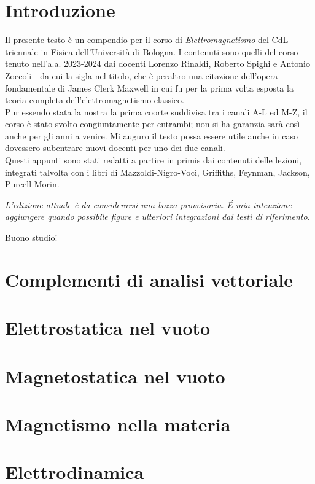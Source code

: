 \documentclass[10pt, oneside]{book}
\begin{document}
\tableofcontents
\newpage

\setcounter{chapter}{-1}

\chapter*{Introduzione}

Il presente testo è un compendio per il corso di \textit{Elettromagnetismo} del CdL triennale in Fisica dell'Università di Bologna. I contenuti sono quelli del corso tenuto nell'a.a. 2023-2024 dai docenti Lorenzo Rinaldi, Roberto Spighi e Antonio Zoccoli - da cui la sigla nel titolo, che è peraltro una citazione dell'opera fondamentale di James Clerk Maxwell in cui fu per la prima volta esposta la teoria completa dell'elettromagnetismo classico. 
\\Pur essendo stata la nostra la prima coorte suddivisa tra i canali A-L ed M-Z, il corso è stato svolto congiuntamente per entrambi; non si ha garanzia sarà così anche per gli anni a venire. Mi auguro il testo possa essere utile anche in caso dovessero subentrare nuovi docenti per uno dei due canali.
\\Questi appunti sono stati redatti a partire in primis dai contenuti delle lezioni, integrati talvolta con i libri di Mazzoldi-Nigro-Voci, Griffiths, Feynman, Jackson, Purcell-Morin.

\begin{center}
\textit{L'edizione attuale è da considerarsi una bozza provvisoria. \'E mia intenzione aggiungere quando possibile figure e ulteriori integrazioni dai testi di riferimento.}
\end{center}
Buono studio!

\chapter{Complementi di analisi vettoriale}



\chapter{Elettrostatica nel vuoto}



\chapter{Magnetostatica nel vuoto}



\chapter{Magnetismo nella materia}



\chapter{Elettrodinamica}


\end{document}
